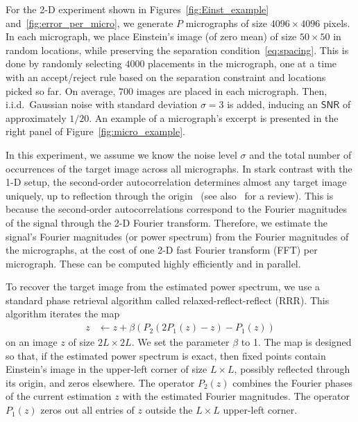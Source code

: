 \documentclass[english,11pt]{article}
\newcommand{\1}{\mathbf{1}}
\numberwithin{equation}{section}
\theoremstyle{plain}
\theoremstyle{definition}
\theoremstyle{remark}
\theoremstyle{plain}
\theoremstyle{remark}
\theoremstyle{plain}
\theoremstyle{plain}
\newcommand{\SNR}{\ensuremath{\textsf{SNR}}}
\begin{document}
For the 2-D experiment shown in Figures~\ref{fig:Einst_example} and~\ref{fig:error_per_micro}, we generate $P$ micrographs of size $4096\times 4096$ pixels. 
In each micrograph, we place Einstein's image (of zero mean) of size $50\times 50$  in random locations, while preserving the separation condition~\eqref{eq:spacing}.  
This is done by randomly selecting $4000$ placements in the micrograph, one at a time with
an accept/reject rule based on the separation constraint and locations picked so far.
On average, $700$ images are placed in each micrograph.   
Then, i.i.d.\ Gaussian noise with standard deviation $\sigma=3$ is added, inducing an $\SNR$ of approximately $1/20$.
An example of a micrograph's excerpt is presented in the right panel of Figure~\ref{fig:micro_example}.


In this experiment, we assume we know the noise level $\sigma$ and the total number of occurrences of the target image across all micrographs.
In stark contrast with the 1-D setup, the second-order autocorrelation determines almost any target image uniquely, up to reflection through the origin~\cite{hayes1982reconstruction} (see also~\cite{bendory2017fourier} for a review). This is because the second-order autocorrelations correspond to the Fourier magnitudes of the signal through the 2-D Fourier transform. 
Therefore, we estimate the signal's Fourier magnitudes (or power spectrum) from the Fourier magnitudes of the micrographs, at the cost of one 2-D fast Fourier transform (FFT) per micrograph. These can be computed highly efficiently and in parallel.

To recover the target image from the estimated power spectrum, we use a standard phase retrieval algorithm called relaxed-reflect-reflect (RRR). This algorithm iterates the map
\begin{align*}
z & \leftarrow z + \beta (P_2(2P_1(z) - z) - P_1(z))
\end{align*}
on an image $z$ of size $2L\times 2L$.
We set the parameter $\beta$ to 1.
The map is designed so that, if the estimated power spectrum is exact, then fixed points contain Einstein's image in the upper-left corner of size $L \times L$, possibly reflected through its origin, and zeros elsewhere. The operator $P_2(z)$ combines the Fourier phases of  the current estimation $z$ with the estimated Fourier magnitudes. The operator $P_1(z)$ zeros out all entries of $z$ outside the $L\times L$ upper-left corner. 
\end{document}

